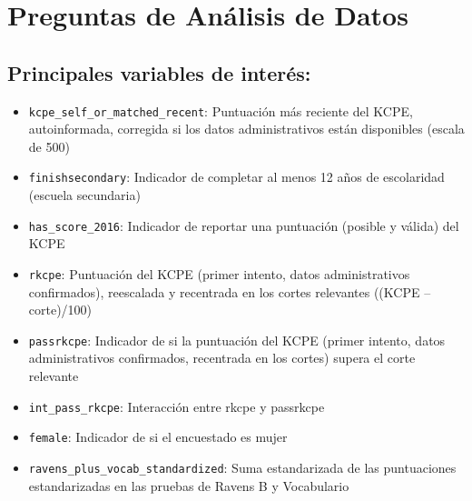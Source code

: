 \documentclass[11pt,a4paper,english]{article}
\begin{document}
\section*{Preguntas de Análisis de Datos}

\subsection*{Principales variables de interés:}
\begin{itemize}
    \item \texttt{kcpe\_self\_or\_matched\_recent}: Puntuación más reciente del KCPE, autoinformada, corregida si los datos administrativos están disponibles (escala de 500)
    \item \texttt{finishsecondary}: Indicador de completar al menos 12 años de escolaridad (escuela secundaria)
    \item \texttt{has\_score\_2016}: Indicador de reportar una puntuación (posible y válida) del KCPE
    \item \texttt{rkcpe}: Puntuación del KCPE (primer intento, datos administrativos confirmados), reescalada y recentrada en los cortes relevantes ((KCPE – corte)/100)
    \item \texttt{passrkcpe}: Indicador de si la puntuación del KCPE (primer intento, datos administrativos confirmados, recentrada en los cortes) supera el corte relevante
    \item \texttt{int\_pass\_rkcpe}: Interacción entre rkcpe y passrkcpe
    \item \texttt{female}: Indicador de si el encuestado es mujer
    \item \texttt{ravens\_plus\_vocab\_standardized}: Suma estandarizada de las puntuaciones estandarizadas en las pruebas de Ravens B y Vocabulario
\end{itemize}
\end{document}
